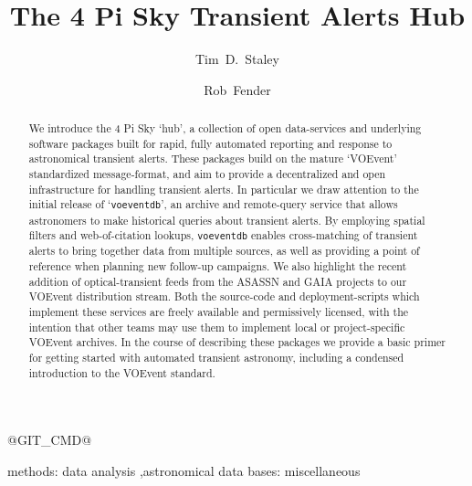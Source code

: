 \documentclass[5p,authoryear]{elsarticle}
\begin{document}
\newcommand{\code}[1]{\texttt{#1}}
\newcommand{\degrees}[1]{$#1^\circ$}

@GIT_CMD@

\begin{frontmatter}

\title{The 4 Pi Sky Transient Alerts Hub }

\author{Tim~D.~Staley}
\author{Rob~Fender}
\address{Astrophysics, Department of Physics, University of Oxford, 
Keble Road, Oxford OX1 3RH, UK}

\begin{abstract}
We introduce the 4 Pi Sky `hub', a collection of open data-services and underlying software packages built for rapid, fully automated reporting and response to astronomical transient alerts. 
These packages build on the mature `VOEvent' standardized message-format, and aim to provide a decentralized and open infrastructure for handling transient alerts. 
In particular we draw attention to the initial release of `\texttt{voeventdb}', an archive and remote-query service that allows astronomers to make historical queries about transient alerts. 
By employing spatial filters and web-of-citation lookups, \texttt{voeventdb} enables cross-matching of transient alerts to bring together data from multiple sources, as well as providing a point of reference when planning new follow-up campaigns.
We also highlight the recent addition of optical-transient feeds from the ASASSN and GAIA projects to our VOEvent distribution stream.
Both the source-code and deployment-scripts which implement these services are freely available and permissively licensed, with the intention that other teams may use them to implement local or project-specific VOEvent archives. 
In the course of describing these packages we provide a basic primer for getting started with automated transient astronomy, including a condensed introduction to the VOEvent standard.
\end{abstract}

\begin{keyword}
methods: data analysis \sep  astronomical data bases: miscellaneous
\end{keyword}

\end{frontmatter}
\end{document}
